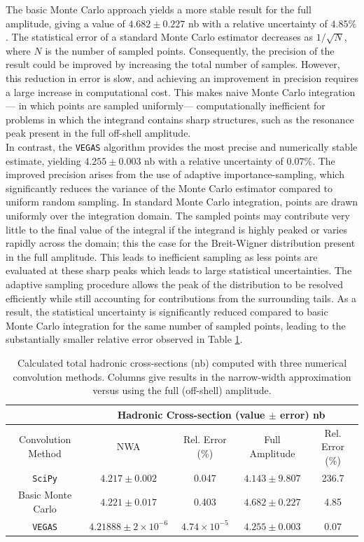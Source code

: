 \documentclass[a4paper,11pt]{article}
\begin{document}
The basic Monte Carlo approach yields a more stable result for the full amplitude, giving a value of $4.682 \pm 0.227$ nb with a relative uncertainty of $4.85\%$. The statistical error of a standard Monte Carlo estimator decreases as $1/\sqrt{N}$, where $N$ is the number of sampled points. Consequently, the precision of the result could be improved by increasing the total number of samples. However, this reduction in error is slow, and achieving an improvement in precision requires a large increase in computational cost. This makes naive Monte Carlo integration --- in which points are sampled uniformly--- computationally inefficient for problems in which the integrand contains sharp structures, such as the resonance peak present in the full off-shell amplitude.\\

In contrast, the \texttt{VEGAS} algorithm provides the most precise and numerically stable estimate, yielding $4.255 \pm  0.003$ nb with a relative uncertainty of $0.07\%$. The improved precision arises from the use of adaptive importance-sampling, which significantly reduces the variance of the Monte Carlo estimator compared to uniform random sampling. In standard Monte Carlo integration, points are drawn uniformly over the integration domain. The sampled points may contribute very little to the final value of the integral if the integrand is highly peaked or varies rapidly across the domain; this the case for the Breit-Wigner distribution present in the full amplitude. This leads to inefficient sampling as less points are evaluated at these sharp peaks which leads to large statistical uncertainties. The adaptive sampling procedure allows the peak of the distribution to be resolved efficiently while still accounting for contributions from the surrounding tails. As a result, the statistical uncertainty is significantly reduced compared to basic Monte Carlo integration for the same number of sampled points, leading to the substantially smaller relative error observed in Table \ref{tab:hadronic-cross}.

\begin{table}[tb]
	\centering
	\begin{tabular}{ccccc}
		\toprule
		& \multicolumn{4}{c}{Hadronic Cross-section (value $\pm$ error) nb} \\
		\midrule
		Convolution Method & NWA &Rel. Error (\%)& Full Amplitude& Rel. Error (\%) \\
		\midrule
		\texttt{SciPy} & $4.217 \pm 0.002$ &0.047& $4.143 \pm 9.807$&  236.7\\
		Basic Monte Carlo & $4.221 \pm 0.017$  &0.403& $4.682 \pm 0.227$ & 4.85 \\
		\texttt{VEGAS} & $4.21888 \pm 2\times10^{-6}$ &$4.74 \times 10^{-5}$ & $4.255 \pm  0.003$& 0.07 \\
		\bottomrule
	\end{tabular}
	\caption{Calculated total hadronic cross-sections (nb) computed with three numerical convolution methods. Columns give results in the narrow-width approximation versus using the full (off-shell) amplitude.}
	\label{tab:hadronic-cross}
\end{table}
\end{document}
